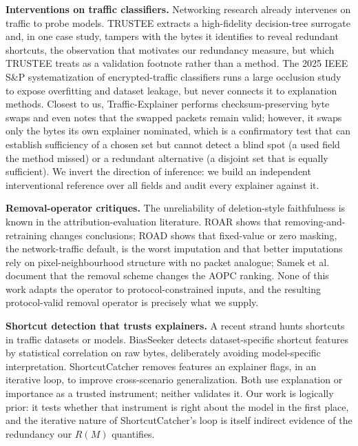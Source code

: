 \documentclass[journal]{IEEEtran}
\begin{document}
\textbf{Interventions on traffic classifiers.} Networking research
already intervenes on traffic to probe models. TRUSTEE
\cite{jacobs2022trustee} extracts a high-fidelity decision-tree
surrogate and, in one case study, tampers with the bytes it identifies
to reveal redundant shortcuts, the observation that motivates our
redundancy measure, but which TRUSTEE treats as a validation footnote
rather than a method. The 2025 IEEE S\&P systematization of
encrypted-traffic classifiers \cite{wickramasinghe2025sok} runs a large
occlusion study to expose overfitting and dataset leakage, but never
connects it to explanation methods. Closest to us, Traffic-Explainer
\cite{ponraj2026trafficexplainer} performs checksum-preserving byte
swaps and even notes that the swapped packets remain valid; however, it
swaps only the bytes its own explainer nominated, which is a
confirmatory test that can establish sufficiency of a chosen set but
cannot detect a blind spot (a used field the method missed) or a
redundant alternative (a disjoint set that is equally sufficient). We
invert the direction of inference: we build an independent
interventional reference over all fields and audit every explainer
against it.

\textbf{Removal-operator critiques.} The unreliability of deletion-style
faithfulness is known in the attribution-evaluation literature. ROAR
\cite{hooker2019benchmark} shows that removing-and-retraining changes
conclusions; ROAD \cite{rong2022consistent} shows that fixed-value or
zero masking, the network-traffic default, is the worst imputation and
that better imputations rely on pixel-neighbourhood structure with no
packet analogue; Samek et al. \cite{samek2017evaluating} document that
the removal scheme changes the AOPC ranking. None of this work adapts
the operator to protocol-constrained inputs, and the resulting
protocol-valid removal operator is precisely what we supply.

\textbf{Shortcut detection that trusts explainers.} A recent strand
hunts shortcuts in traffic datasets or models. BiasSeeker
\cite{wang2026biasseeker} detects dataset-specific shortcut features by
statistical correlation on raw bytes, deliberately avoiding
model-specific interpretation. ShortcutCatcher
\cite{zhao2026shortcutcatcher} removes features an explainer flags, in
an iterative loop, to improve cross-scenario generalization. Both use
explanation or importance as a trusted instrument; neither validates it.
Our work is logically prior: it tests whether that instrument is right
about the model in the first place, and the iterative nature of
ShortcutCatcher's loop is itself indirect evidence of the redundancy our
$R(M)$ quantifies.
\end{document}
